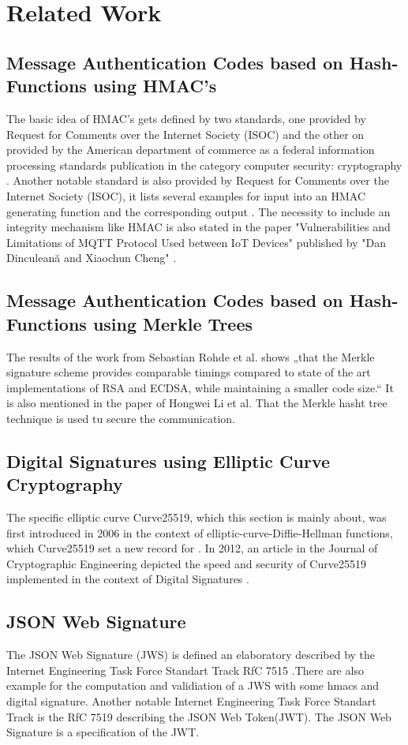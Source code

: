 \section{Related Work}

\subsection{Message Authentication Codes based on Hash-Functions using HMAC's}

The basic idea of HMAC’s gets defined by two standards, one provided by Request for Comments over the Internet Society (ISOC) \cite{RFC} and the other on provided by the American department of commerce as a federal information processing standards publication in the category computer security: cryptography \cite{FIBS}. Another notable standard is also provided by Request for Comments over the Internet Society (ISOC), it lists several examples for input into an HMAC generating function and the corresponding output \cite{RFC2}. The necessity to include an integrity mechanism like HMAC is also stated in the paper "Vulnerabilities and Limitations of MQTT Protocol
Used between IoT Devices" published by "Dan Dinculeană and Xiaochun Cheng" \cite{LIMI}.

\subsection{Message Authentication Codes based on Hash-Functions using Merkle Trees}
The results of the work from Sebastian Rohde et al. shows „that the Merkle signature scheme provides comparable timings compared to state of the art implementations of RSA and ECDSA, while maintaining a smaller code size.“ \cite{FHB} It is also mentioned in the paper of Hongwei Li et al. That the Merkle hasht tree technique is used tu secure the communication. \cite{METR}

\subsection{Digital Signatures using Elliptic Curve Cryptography}
The specific elliptic curve Curve25519, which this section is mainly about, was first introduced in 2006 in the context of elliptic-curve-Diffie-Hellman functions, which Curve25519 set a new record for \cite{ECDH}. In 2012, an article in the Journal of Cryptographic Engineering depicted the speed and security of Curve25519 implemented in the context of Digital Signatures \cite{Curve25519}.

\subsection{JSON Web Signature}
The JSON Web Signature (JWS) is defined an elaboratory described by the Internet Engineering Task Force Standart Track RfC 7515 \cite{rfc7515}.There are also example for the computation and validiation of a JWS with some hmacs and digital signature. Another notable Internet Engineering Task Force Standart Track is the RfC 7519 \cite{rfc7519}describing the JSON Web Token(JWT). The JSON Web Signature is a specification of the JWT.
